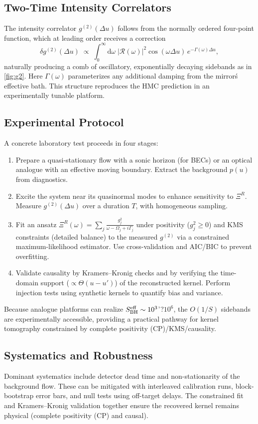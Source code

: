 \documentclass[aps,prd,preprint,onecolumn,superscriptaddress,nofootinbib,longbibliography,floatfix,11pt,showpacs,showkeys]{revtex4-2}
\newcommand{\HMC}{\textsc{HMC}\xspace}
\theoremstyle{plain}
\theoremstyle{definition}
\theoremstyle{remark}
\begin{document}
\subsection{Two-Time Intensity Correlators}
The intensity correlator $g^{(2)}(\Delta u)$ follows from the normally ordered four-point function, which at leading order receives a correction
\begin{equation}
\delta g^{(2)}(\Delta u)\;\propto\; \int_{0}^{\infty} \mathrm{d}\omega\;\left|\mathcal{R}(\omega)\right|^2\cos(\omega\Delta u)\,e^{-\Gamma(\omega)\Delta u},
\end{equation}
naturally producing a comb of oscillatory, exponentially decaying sidebands as in \cref{fig:g2}. Here $\Gamma(\omega)$ parameterizes any additional damping from the mirror\'s effective bath. This structure reproduces the \HMC{} prediction in an experimentally tunable platform.

\subsection{Experimental Protocol}
A concrete laboratory test proceeds in four stages:
\begin{enumerate}
  \item Prepare a quasi-stationary flow with a sonic horizon (for BECs) or an optical analogue with an effective moving boundary. Extract the background $p(u)$ from diagnostics.
  \item Excite the system near its quasinormal modes to enhance sensitivity to $\Xi^R$. Measure $g^{(2)}(\Delta u)$ over a duration $T$, with homogeneous sampling.
  \item Fit an ansatz $\Xi^R(\omega)=\sum_j \frac{g_j^2}{\omega-\Omega_j+i\Gamma_j}$ under positivity ($g_j^2\ge 0$) and KMS constraints (detailed balance) to the measured $g^{(2)}$ via a constrained maximum-likelihood estimator. Use cross-validation and AIC/BIC to prevent overfitting.
  \item Validate causality by Kramers--Kronig checks and by verifying the time-domain support ($\propto \Theta(u-u')$) of the reconstructed kernel. Perform injection tests using synthetic kernels to quantify bias and variance.
\end{enumerate}
Because analogue platforms can realize $S_{\rm BH}^{\rm eff}\sim 10^3$'?$10^6$, the $O(1/S)$ sidebands are experimentally accessible, providing a practical pathway for kernel tomography constrained by complete positivity (CP)/KMS/causality.

\subsection{Systematics and Robustness}
Dominant systematics include detector dead time and non-stationarity of the background flow. These can be mitigated with interleaved calibration runs, block-bootstrap error bars, and null tests using off-target delays. The constrained fit and Kramers--Kronig validation together ensure the recovered kernel remains physical (complete positivity (CP) and causal).
\end{document}
